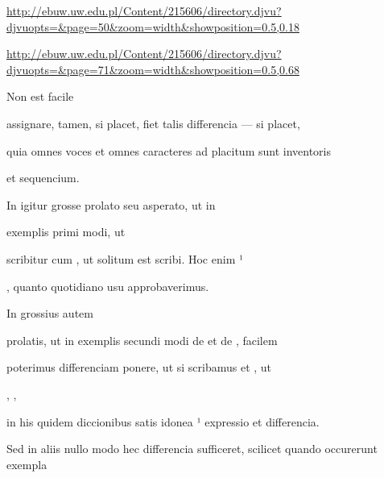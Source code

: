 
\newParkoszpage


{
\url{http://ebuw.uw.edu.pl/Content/215606/directory.djvu?djvuopts=&page=50&zoom=width&showposition=0.5,0.18}

\url{http://ebuw.uw.edu.pl/Content/215606/directory.djvu?djvuopts=&page=71&zoom=width&showposition=0.5,0.68}
}

\bigskip

\obeylines
\mono


\fullpreviouslines


{
\color{blue}
Non est facile 

assignare, tamen, si placet, fiet talis differencia — si placet,

}


\fulllines
quia omnes voces et omnes caracteres ad placitum sunt inventoris

\splitlines
et sequencium.

\indentK In  igitur grosse prolato seu asperato, ut in

\fulllines

exemplis primi modi, ut     

scribitur  cum , ut solitum est scribi. Hoc enim ¹ 

\splitlines

, quanto quotidiano usu approbaverimus.

\indentK In grossius autem

\fulllines

prolatis, ut in exemplis secundi modi de  et de , facilem

poterimus differenciam ponere, ut si scribamus  et , ut 

,     ,

in his quidem diccionibus satis idonea ¹ expressio et differencia.

Sed in aliis nullo modo hec differencia sufficeret, scilicet quando occurerunt exempla

